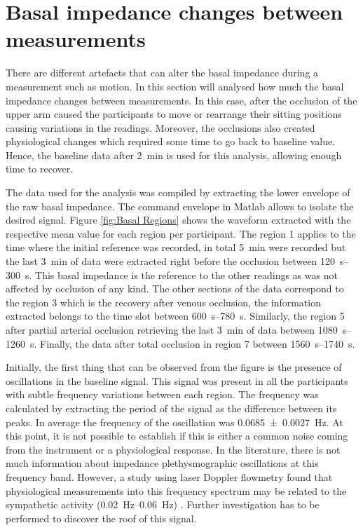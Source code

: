 \section{Basal impedance changes between measurements}
\label{senction basal 3}
There are different artefacts that can alter the basal impedance during a measurement such as motion. In this section will analysed how much the basal impedance changes between measurements. In this case, after the occlusion of the upper arm caused the participants to move or rearrange their sitting positions causing variations in the readings. Moreover, the occlusions also created physiological changes which required some time to go back to baseline value. Hence, the baseline data after \SI{2}{\minute} is used for this analysis, allowing enough time to recover. 

The data used for the analysis was compiled by extracting the lower envelope of the raw basal impedance. The command envelope in Matlab \cite{MATLAB:2016} allows to isolate the desired signal. Figure \ref{fig:Basal Regions} shows the waveform extracted with the respective mean value for each region per participant. The region 1 applies to the time where the initial reference was recorded, in total \SI{5}{\minute} were recorded but the last \SI{3}{\minute} of data were extracted right before the occlusion between \SIrange{120}{300}{\second}. This basal impedance is the reference to the other readings as was not affected by occlusion of any kind. The other sections of the data correspond to the region 3 which is the recovery after venous occlusion, the information extracted belongs to the time slot between \SIrange{ 600}{780}{\second}.  Similarly, the region 5 after partial arterial occlusion retrieving the last \SI{3}{\minute} of data between \SIrange{1080}{1260}{\second}. Finally, the data after total occlusion in region 7 between \SIrange{1560}{1740}{\second}.

Initially, the first thing that can be observed from the figure is the presence of oscillations in the baseline signal. This signal was present in all the participants with subtle frequency variations between each region. The frequency was calculated by extracting the period of the signal as the difference between its peaks. In average the frequency of the oscillation was \SI{0.0685(00027)}{\hertz}. At this point, it is not possible to establish if this is either a common noise coming from the instrument or a physiological response. In the literature, there is not much information about impedance plethysmographic oscillations at this frequency band.  However, a study using laser Doppler flowmetry found that physiological measurements into this frequency spectrum may be related to the sympathetic activity (\SIrange{0.02}{0.06}{\hertz}) \cite{kvandal2006low}. Further investigation has to be performed to discover the roof of this signal. 

